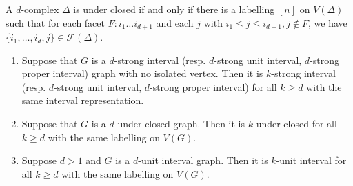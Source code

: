 \documentclass[10pt,a4paper]{amsart}
\begin{document}
\begin{lemma}\label{global}
A $d$-complex $\Delta$ is under closed if and only if there is a labelling $[n]$ on $V(\Delta)$ such that  for each facet $F: i_1\dots i_{d+1}$ and each $j$ with $i_1\leq j\leq i_{d+1}, j\notin F$, we have $\{i_1, \dots , i_d, j\}\in \mathcal{F}(\Delta)$.
\end{lemma}

\begin{theorem}\label{1.4}
\begin{enumerate}
\item Suppose that $G$ is a $d$-strong interval (resp. $d$-strong unit interval, $d$-strong proper interval) graph with no isolated vertex. Then it is $k$-strong interval (resp. $d$-strong unit interval, $d$-strong proper interval) for all $k\geq d$ with the same interval representation.

\item Suppose that $G$ is a $d$-under closed graph. Then it is $k$-under closed for all $k\geq d$ with the same labelling on $V(G)$.

\item Suppose $d>1$ and $G$ is a $d$-unit interval graph. Then it is $k$-unit interval for all $k\geq d$ with the same labelling on $V(G)$.
\end{enumerate}
\end{theorem}
\end{document}
